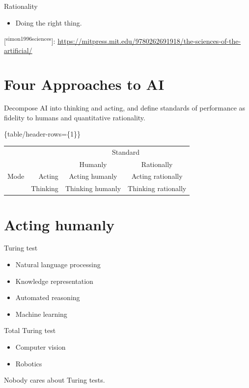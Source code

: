 \documentclass[11pt]{article}
\begin{document}
Rationality

\begin{itemize}
\item Doing the right thing.
\end{itemize}




{[}\textsuperscript{simon1996sciences}]: \url{https://mitpress.mit.edu/9780262691918/the-sciences-of-the-artificial/}
\section{Four Approaches to AI}
\label{sec:org8dfbfb5}

Decompose AI into thinking and acting, and define standards of performance as fidelity to humans and quantitative rationality.


\begin{latex}
\tagpdfsetup\{table/header-rows=\{1\}\}
\begin{tabular}{lr|cc}\\
     &          & \multicolumn{2}{c}{Standard} \\
     &          & Humanly  & Rationally \\\hline
Mode & Acting   & Acting humanly & Acting rationally \\
     & Thinking & Thinking humanly & Thinking rationally \\
\end{tabular}
\end{latex}
\section{Acting humanly}
\label{sec:orgda442e7}

Turing test

\begin{itemize}
\item Natural language processing
\item Knowledge representation
\item Automated reasoning
\item Machine learning
\end{itemize}

Total Turing test

\begin{itemize}
\item Computer vision
\item Robotics
\end{itemize}

Nobody cares about Turing tests.
\end{document}
